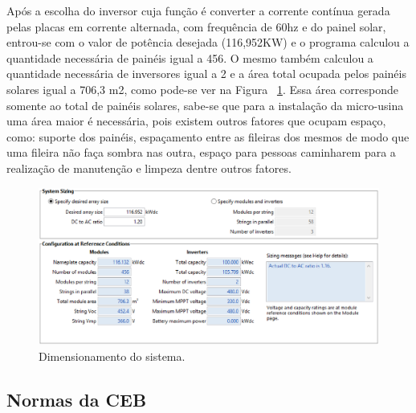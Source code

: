 Após a escolha do inversor cuja função é converter a corrente contínua gerada pelas placas em corrente alternada, com frequência de 60hz e do painel solar, entrou-se com o valor de potência desejada (116,952KW) e o programa calculou a quantidade necessária de painéis igual a 456. O mesmo também calculou a quantidade necessária de inversores igual a 2 e a área total ocupada pelos painéis solares igual a 706,3 m2, como pode-se ver na Figura ~\ref{fig:estimativa_paineis}. Essa área corresponde somente ao total de painéis solares, sabe-se que para a instalação da micro-usina uma área maior é necessária, pois existem outros fatores que ocupam espaço, como: suporte dos painéis, espaçamento entre as fileiras dos mesmos de modo que uma fileira não faça sombra nas outra, espaço para pessoas caminharem para a realização de manutenção e limpeza dentre outros fatores.

\begin{figure}[!h]
  \centering
  \includegraphics[keepaspectratio=true,scale=0.5]{figuras/estimativa_paineis.eps}
  \caption{Dimensionamento do sistema.}
  \label{fig:estimativa_paineis}
\end{figure}

\subsection{Normas da CEB}

